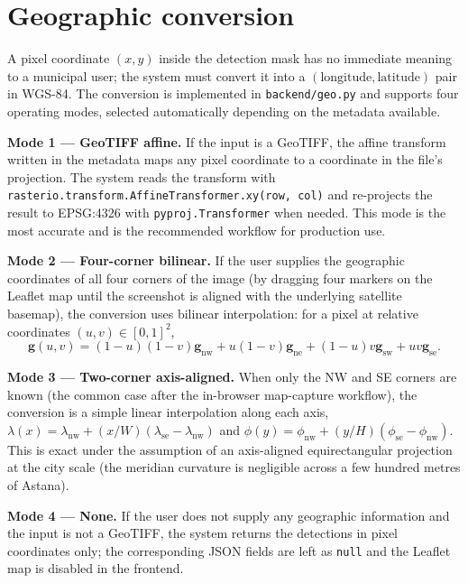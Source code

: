 \section{Geographic conversion}\label{geographic-conversion}

A pixel coordinate \((x, y)\) inside the detection mask has no immediate meaning to a municipal user; the system must convert it into a \((\text{longitude}, \text{latitude})\) pair in WGS-84. The conversion is implemented in \texttt{backend/geo.py} and supports four operating modes, selected automatically depending on the metadata available.

\textbf{Mode 1 --- GeoTIFF affine.} If the input is a GeoTIFF, the affine transform written in the metadata maps any pixel coordinate to a coordinate in the file's projection. The system reads the transform with \texttt{rasterio.transform.AffineTransformer.xy(row,\ col)} and re-projects the result to EPSG:4326 with \texttt{pyproj.Transformer} when needed. This mode is the most accurate and is the recommended workflow for production use.

\textbf{Mode 2 --- Four-corner bilinear.} If the user supplies the geographic coordinates of all four corners of the image (by dragging four markers on the Leaflet map until the screenshot is aligned with the underlying satellite basemap), the conversion uses bilinear interpolation: for a pixel at relative coordinates \((u, v) \in [0,1]^{2}\), \begin{equation}
\mathbf{g}(u,v) = (1-u)(1-v)\mathbf{g}_{\text{nw}} + u(1-v)\mathbf{g}_{\text{ne}} + (1-u)v\mathbf{g}_{\text{sw}} + uv\mathbf{g}_{\text{se}}.
\end{equation}

\textbf{Mode 3 --- Two-corner axis-aligned.} When only the NW and SE corners are known (the common case after the in-browser map-capture workflow), the conversion is a simple linear interpolation along each axis, \(\lambda(x) = \lambda_{\text{nw}} + (x/W)(\lambda_{\text{se}} - \lambda_{\text{nw}})\) and \(\phi(y) = \phi_{\text{nw}} + (y/H)(\phi_{\text{se}} - \phi_{\text{nw}})\). This is exact under the assumption of an axis-aligned equirectangular projection at the city scale (the meridian curvature is negligible across a few hundred metres of Astana).

\textbf{Mode 4 --- None.} If the user does not supply any geographic information and the input is not a GeoTIFF, the system returns the detections in pixel coordinates only; the corresponding JSON fields are left as \texttt{null} and the Leaflet map is disabled in the frontend.

